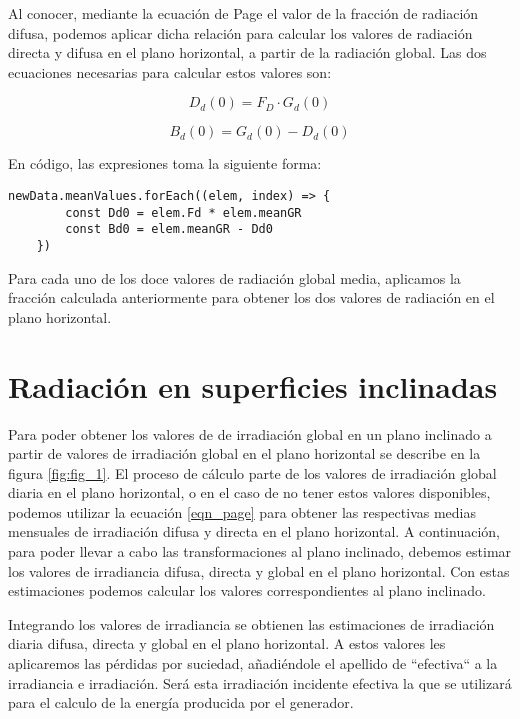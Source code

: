 Al conocer, mediante la ecuación de Page el valor de la fracción de radiación difusa, podemos aplicar dicha relación para calcular los valores de radiación directa y difusa en el plano horizontal, a partir de la radiación global.
Las dos ecuaciones necesarias para calcular estos valores son:

\begin{equation}\label{eqn_rad_directa}
D_d(0) = F_D · G_d(0)
\end{equation}

\begin{equation}\label{eqn_rad_directa}
B_d(0) = G_d(0) - D_d(0)
\end{equation}

En código, las expresiones toma la siguiente forma:
\begin{lstlisting}[style=ES6, caption={Radiación directa y difusa}]
	newData.meanValues.forEach((elem, index) => {
		const Dd0 = elem.Fd * elem.meanGR
		const Bd0 = elem.meanGR - Dd0
	})
\end{lstlisting}

Para cada uno de los doce valores de radiación global media, aplicamos la fracción calculada anteriormente para obtener los dos valores de radiación en el plano horizontal.

\section{Radiación en superficies inclinadas}

Para poder obtener los valores de de irradiación global en un plano inclinado a partir de valores de irradiación global en el plano horizontal se describe en la figura \ref{fig:fig_1}. El proceso de cálculo parte de los valores de irradiación global diaria en el plano horizontal, o en el caso de no tener estos valores disponibles, podemos utilizar la ecuación \ref{eqn_page} para obtener las respectivas medias mensuales de irradiación difusa y directa en el plano horizontal.
A continuación, para poder llevar a cabo las transformaciones al plano inclinado, debemos estimar los valores de irradiancia difusa, directa y global en el plano horizontal. Con estas estimaciones podemos calcular los valores correspondientes al plano inclinado.

Integrando los valores de irradiancia se obtienen las estimaciones de irradiación diaria difusa, directa y global en el plano horizontal. A estos valores les aplicaremos las pérdidas por suciedad, añadiéndole el apellido de ``efectiva`` a la irradiancia e irradiación. Será esta irradiación incidente efectiva la que se utilizará para el calculo de la energía producida por el generador.

